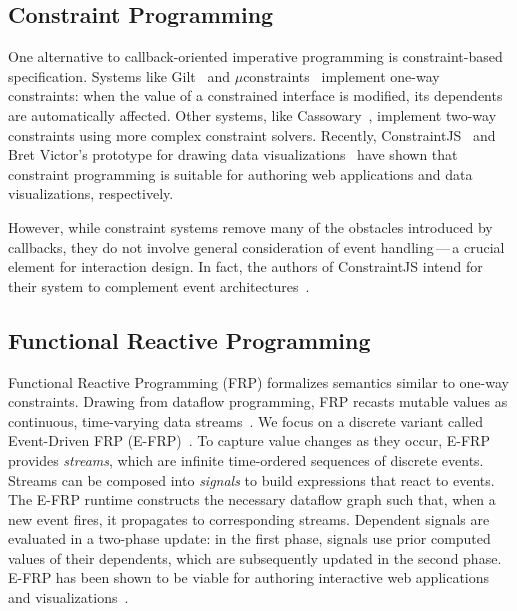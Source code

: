 \subsection{Constraint Programming}

One alternative to callback-oriented imperative programming is constraint-based
specification. Systems like Gilt~\cite{myers:callbacks} and
$\mu$constraints~\cite{hudson:constraints} implement one-way constraints: when
the value of a constrained interface is modified, its dependents are
automatically affected. Other systems, like Cassowary~\cite{badros:cassowary},
implement two-way constraints using more complex constraint solvers. Recently,
ConstraintJS~\cite{oney:constraintjs} and Bret Victor's prototype for drawing
data visualizations~\cite{victor:drawing} have shown that constraint programming
is suitable for authoring web applications and data visualizations,
respectively.

However, while constraint systems remove many of the obstacles introduced by
callbacks, they do not involve general consideration of event handling\,---\,a
crucial element for interaction design. In fact, the authors of ConstraintJS
intend for their system to complement event
architectures~\cite{oney:constraintjs}.

\subsection{Functional Reactive Programming}

Functional Reactive Programming (FRP) formalizes semantics similar to one-way
constraints. Drawing from dataflow programming, FRP recasts mutable values as
continuous, time-varying data streams~\cite{bainomugisha:frpsurvey}. We focus on
a discrete variant called Event-Driven FRP (E-FRP)~\cite{wan:efrp}. To capture
value changes as they occur, E-FRP provides \emph{streams}, which are infinite
time-ordered sequences of discrete events. Streams can be composed into
\emph{signals} to build expressions that react to events. The E-FRP runtime
constructs the necessary dataflow graph such that, when a new event fires, it
propagates to corresponding streams. Dependent signals are evaluated in a
two\--phase update: in the first phase, signals use prior computed values of
their dependents, which are subsequently updated in the second phase. E-FRP has
been shown to be viable for authoring interactive web
applications~\cite{czaplicki:elm, meyerovich:flapjax} and
visualizations~\cite{cottam:stencil, kelleher:modeljs}.

